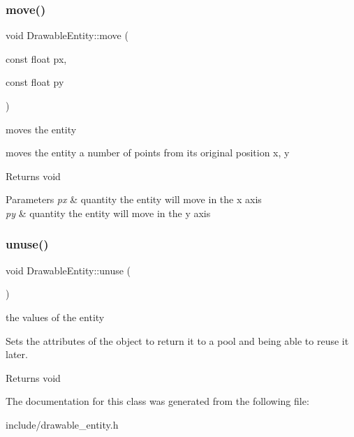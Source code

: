 \subsubsection{\texorpdfstring{move()}{move()}}
{\footnotesize\ttfamily void Drawable\+Entity\+::move (\begin{DoxyParamCaption}\item[{const float}]{px,  }\item[{const float}]{py }\end{DoxyParamCaption})}



moves the entity 

moves the entity a number of points from it\textquotesingle{}s original position x, y

\begin{DoxyReturn}{Returns}
void 
\end{DoxyReturn}

\begin{DoxyParams}{Parameters}
{\em px} & quantity the entity will move in the x axis \\
\hline
{\em py} & quantity the entity will move in the y axis \\
\hline
\end{DoxyParams}
\mbox{\label{class_drawable_entity_ab1f94327e78e0b3607ece6a66bf9f01c}} 
\subsubsection{\texorpdfstring{unuse()}{unuse()}}
{\footnotesize\ttfamily void Drawable\+Entity\+::unuse (\begin{DoxyParamCaption}{ }\end{DoxyParamCaption})}

the values of the entity

Sets the attributes of the object to return it to a pool and being able to reuse it later.

\begin{DoxyReturn}{Returns}
void 
\end{DoxyReturn}


The documentation for this class was generated from the following file\+:\begin{DoxyCompactItemize}
\item 
include/drawable\+\_\+entity.\+h\end{DoxyCompactItemize}
